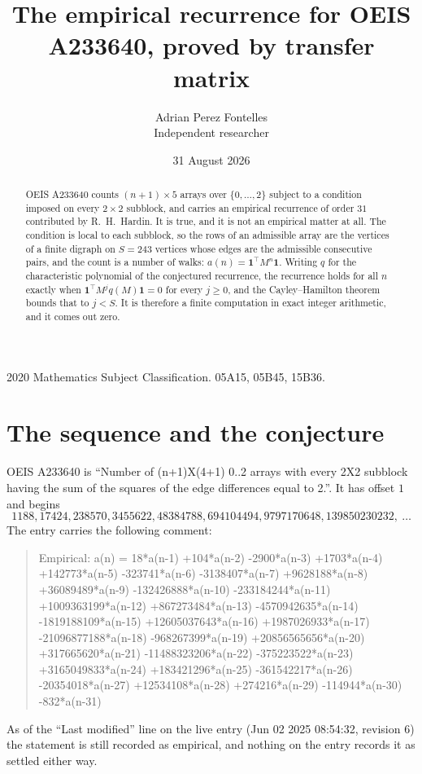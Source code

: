 \documentclass[11pt,a4paper]{article}
\title{The empirical recurrence for OEIS A233640, proved by transfer matrix}
\author{Adrian Perez Fontelles\\ \small Independent researcher}
\date{31 August 2026}
\theoremstyle{plain}
\theoremstyle{definition}
\begin{document}
\maketitle

\begin{abstract}
OEIS A233640 counts $(n+1)\times5$ arrays over $\{0,\dots,2\}$ subject to a condition imposed on
every $2\times2$ subblock, and carries an empirical recurrence of order $31$ contributed
by R.~H.~Hardin. It is true, and it is not an empirical matter at all. The condition is local
to each subblock, so the rows of an admissible array are the vertices of a finite digraph
on $S=243$ vertices whose edges are the admissible consecutive pairs, and the count is a
number of walks: $a(n)=\mathbf{1}^{\!\top}M^{n}\mathbf{1}$. Writing $q$
for the characteristic polynomial of the conjectured recurrence, the recurrence holds for all
$n$ exactly when $\mathbf{1}^{\!\top}M^{j}q(M)\mathbf{1}=0$ for every $j\ge0$, and the
Cayley--Hamilton theorem bounds that to $j<S$. It is therefore a finite computation in exact
integer arithmetic, and it comes out zero.
\end{abstract}

\noindent\small 2020 Mathematics Subject Classification. 05A15, 05B45, 15B36.\normalsize

\section{The sequence and the conjecture}

OEIS A233640 is ``Number of (n+1)X(4+1) 0..2 arrays with every 2X2 subblock having the sum of the squares of the edge differences equal to 2.''. It has offset $1$ and begins
\[
1188, 17424, 238570, 3455622, 48384788, 694104494, 9797170648, 139850230232,\ \dots
\]
The entry carries the following comment:
\begin{quote}\small
Empirical: a(n) = 18*a(n-1) +104*a(n-2) -2900*a(n-3) +1703*a(n-4) +142773*a(n-5) -323741*a(n-6) -3138407*a(n-7) +9628188*a(n-8) +36089489*a(n-9) -132426888*a(n-10) -233184244*a(n-11) +1009363199*a(n-12) +867273484*a(n-13) -4570942635*a(n-14) -1819188109*a(n-15) +12605037643*a(n-16) +1987026933*a(n-17) -21096877188*a(n-18) -968267399*a(n-19) +20856565656*a(n-20) +317665620*a(n-21) -11488323206*a(n-22) -375223522*a(n-23) +3165049833*a(n-24) +183421296*a(n-25) -361542217*a(n-26) -20354018*a(n-27) +12534108*a(n-28) +274216*a(n-29) -114944*a(n-30) -832*a(n-31)
\end{quote}
As of the ``Last modified'' line on the live entry (Jun 02 2025 08:54:32, revision 6) the statement is
still recorded as empirical, and nothing on the entry records it as settled either way.
\end{document}
